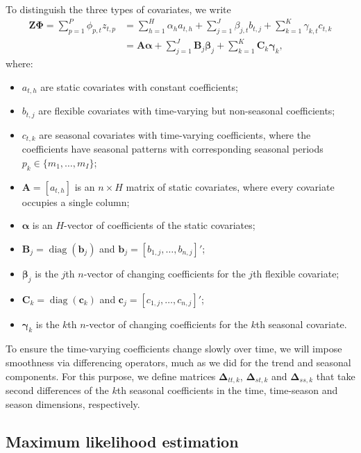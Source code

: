 \documentclass[11pt,a4paper,]{article}
\providecommand{\tightlist}{%
  \setlength{\itemsep}{0pt}\setlength{\parskip}{0pt}}
\begin{document}
To distinguish the three types of covariates, we write
\begin{align*}
  \bm{Z}\bm{\Phi} = \sum_{p=1}^P \phi_{p,t}z_{t,p}
  & =
    \sum_{h=1}^{H} \alpha_{h}{a}_{t,h} +
    \sum_{j=1}^{J} \beta_{j,t}{b}_{t,j} +
    \sum_{k=1}^{K} \gamma_{k,t}{c}_{t,k} \\
  & =
    \bm{A}\bm{\alpha} +
    \sum_{j=1}^{J} \bm{B}_j \bm{\beta}_j +
    \sum_{k=1}^{K} \bm{C}_k \bm{\gamma}_{k},
\end{align*}
where:

\begin{itemize}
\tightlist
\item
  \(a_{t,h}\) are static covariates with constant coefficients;
\item
  \(b_{t,j}\) are flexible covariates with time-varying but non-seasonal coefficients;
\item
  \(c_{t,k}\) are seasonal covariates with time-varying coefficients, where the coefficients have seasonal patterns with corresponding seasonal periods \(p_k \in \{m_1,\dots,m_I\}\);
\item
  \(\bm{A} = [a_{t,h}]\) is an \(n \times H\) matrix of static covariates, where every covariate occupies a single column;
\item
  \(\bm{\alpha}\) is an \(H\)-vector of coefficients of the static covariates;
\item
  \(\bm{B}_j = \operatorname{diag}(\bm{b}_j)\) and \(\bm{b}_j = [b_{1,j},\dots,b_{n,j}]'\);
\item
  \(\bm{\beta}_j\) is the \(j\)th \(n\)-vector of changing coefficients for the \(j\)th flexible covariate;
\item
  \(\bm{C}_k = \operatorname{diag}(\bm{c}_k)\) and \(\bm{c}_j = [c_{1,j},\dots,c_{n,j}]'\);
\item
  \(\bm{\gamma}_k\) is the \(k\)th \(n\)-vector of changing coefficients for the \(k\)th seasonal covariate.
\end{itemize}

To ensure the time-varying coefficients change slowly over time, we will impose smoothness via differencing operators, much as we did for the trend and seasonal components. For this purpose, we define matrices \(\bm{\Delta}_{tt,k}\), \(\bm{\Delta}_{st,k}\) and \(\bm{\Delta}_{ss,k}\) that take second differences of the \(k\)th seasonal coefficients in the time, time-season and season dimensions, respectively.

\hypertarget{maximum-likelihood-estimation}{%
\subsection{Maximum likelihood estimation}\label{maximum-likelihood-estimation}}
\end{document}
